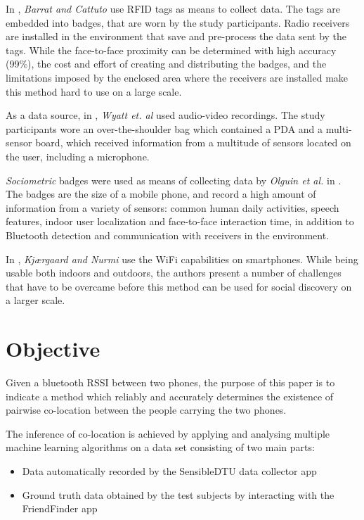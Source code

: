 In \cite{catt}, \textit{Barrat and Cattuto} use RFID tags as means to collect data. The tags are embedded into badges, that are worn by the study participants. Radio receivers are installed in the environment that save and pre-process the data sent by the tags. While the face-to-face proximity can be determined with high accuracy (99\%), the cost and effort of creating and distributing the badges, and the limitations imposed by the enclosed area where the receivers are installed make this method hard to use on a large scale.

As a data source, in \cite{audiovideo}, \textit{Wyatt et. al} used audio-video recordings. The study participants wore an over-the-shoulder bag which contained a PDA and a multi-sensor board, which received information from a multitude of sensors located on the user, including a microphone.

\textit{Sociometric} badges were used as means of collecting data by \textit{Olguin et al.} in \cite{onbody}. The badges are the size of a mobile phone, and record a high amount of information from a variety of sensors: common human daily activities, speech features, indoor user localization and face-to-face interaction time, in addition to Bluetooth detection and communication with receivers in the environment.

In \cite{wifi}, \textit{ Kjærgaard and Nurmi} use the WiFi capabilities on smartphones. While being usable both indoors and outdoors, the authors present a number of challenges that have to be overcame before this method can be used for social discovery on a larger scale.   
 
\section{Objective}

Given a bluetooth RSSI between two phones, the purpose of this paper is to indicate a method which reliably and accurately determines the existence of pairwise co-location between the people carrying the two phones.
 
The inference of co-location is achieved by applying and analysing multiple machine learning algorithms on a data set consisting of two main parts:
\begin{itemize}
  \item Data automatically recorded by the SensibleDTU data collector app \cite{Stopczynski}
  \item Ground truth data obtained by the test subjects by interacting with the FriendFinder app
\end{itemize}

